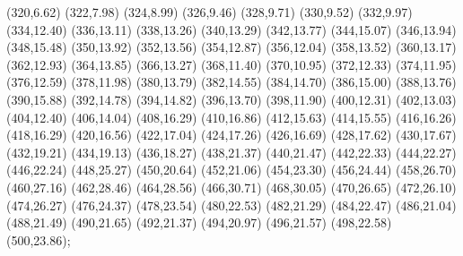 {{	(320,6.62) (322,7.98) (324,8.99) (326,9.46) (328,9.71) (330,9.52) (332,9.97) (334,12.40)
	(336,13.11) (338,13.26) (340,13.29) (342,13.77) (344,15.07) (346,13.94) (348,15.48) (350,13.92)
	(352,13.56) (354,12.87) (356,12.04) (358,13.52) (360,13.17) (362,12.93) (364,13.85) (366,13.27)
	(368,11.40) (370,10.95) (372,12.33) (374,11.95) (376,12.59) (378,11.98) (380,13.79) (382,14.55)
	(384,14.70) (386,15.00) (388,13.76) (390,15.88) (392,14.78) (394,14.82) (396,13.70) (398,11.90)
	(400,12.31) (402,13.03) (404,12.40) (406,14.04) (408,16.29) (410,16.86) (412,15.63) (414,15.55)
	(416,16.26) (418,16.29) (420,16.56) (422,17.04) (424,17.26) (426,16.69) (428,17.62) (430,17.67)
	(432,19.21) (434,19.13) (436,18.27) (438,21.37) (440,21.47) (442,22.33) (444,22.27) (446,22.24)
	(448,25.27) (450,20.64) (452,21.06) (454,23.30) (456,24.44) (458,26.70) (460,27.16) (462,28.46)
	(464,28.56) (466,30.71) (468,30.05) (470,26.65) (472,26.10) (474,26.27) (476,24.37) (478,23.54)
	(480,22.53) (482,21.29) (484,22.47) (486,21.04) (488,21.49) (490,21.65) (492,21.37) (494,20.97)
	(496,21.57) (498,22.58) (500,23.86)};}
